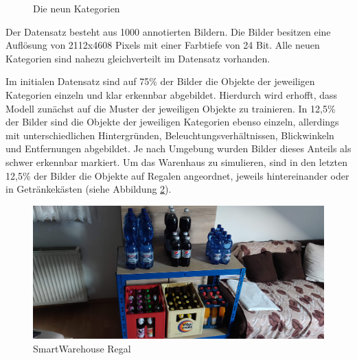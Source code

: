 \begin{figure}[htb]
	\caption{Die neun Kategorien}
	\label{categories}
\end{figure}

Der Datensatz besteht aus 1000 annotierten Bildern. Die Bilder besitzen eine Auflösung von 2112x4608 Pixels mit einer Farbtiefe von 24 Bit. Alle neuen Kategorien sind nahezu gleichverteilt im Datensatz vorhanden. 

Im initialen Datensatz sind auf 75\% der Bilder die Objekte der jeweiligen Kategorien einzeln und klar erkennbar abgebildet. Hierdurch wird erhofft, dass Modell zunächst auf die Muster der jeweiligen Objekte zu trainieren. In 12,5\% der Bilder sind die Objekte der jeweiligen Kategorien ebenso einzeln, allerdings mit unterschiedlichen Hintergründen, Beleuchtungsverhältnissen, Blickwinkeln und Entfernungen abgebildet. Je nach Umgebung wurden Bilder dieses Anteils als schwer erkennbar markiert. Um das Warenhaus zu simulieren, sind in den letzten 12,5\% der Bilder die Objekte auf Regalen angeordnet, jeweils hintereinander oder in Getränkekästen (siehe Abbildung \ref{regal}). 

\begin{figure}[ht]
	\begin{center}
		\includegraphics[width=16cm]{Bilder/regal.jpg} 
		\caption[Smart Warehouse Regal]{SmartWarehouse Regal}
		\label{regal}
	\end{center}
\end{figure}
